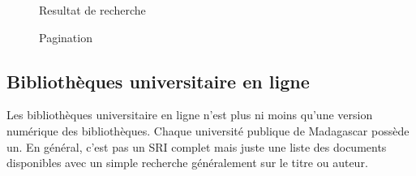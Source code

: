 \begin{figure}[htbp]
	\begin{center}
	\end{center}
	\caption{Resultat de recherche \citep{these-malgache-en-ligne}}
	\label{fig:resultat-tme}
\end{figure}

\begin{figure}[htbp]
	\begin{center}
	\end{center}
	\caption{Pagination \citep{these-malgache-en-ligne}}
	\label{fig:pagination-tme}
\end{figure}

\subsection{Bibliothèques universitaire en ligne}
Les bibliothèques universitaire en ligne n'est plus ni moins qu'une version numérique des bibliothèques. Chaque université publique de Madagascar possède un. En général, c'est pas un SRI complet mais juste une liste des documents disponibles avec un simple recherche généralement sur le titre ou auteur. 


